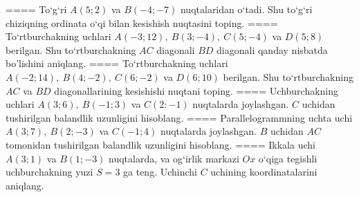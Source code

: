 ====
To‘g‘ri \(A (5;2) \) va \(B (-4; -7) \) nuqtalaridan o‘tadi.
Shu to‘g‘ri chiziqning ordinata o‘qi bilan kesishish nuqtasini toping.
====
To‘rtburchakning uchlari
\(A (-3;12),\ B (3;-4),\ C (5;-4) \) va \(D (5;8) \) berilgan. Shu
to‘rtburchakning $AC$ diagonali $BD$ diagonali qanday
nisbatda bo'lishini aniqlang.
====
To‘rtburchakning uchlari
\(A (-2;14),\ B (4;-2),\ C (6;-2) \) va \(D (6;10) \) berilgan. Shu
to‘rtburchakning $AC$ va $BD$ diagonallarining kesishishi
nuqtani toping.
====
Uchburchakning uchlari \(A (3;6),\ B (-1;3) \) va
\(C (2:-1) \) nuqtalarda joylashgan. $C$ uchidan tushirilgan balandlik uzunligini hisoblang.
====
Parallelogrammning uchta uchi \(A (3;7),\ B (2;-3) \) va
\(C (-1;4) \) nuqtalarda joylashgan. $B$ uchidan $AC$
tomonidan tushirilgan balandlik uzunligini hisoblang.
====
Ikkala uchi \(A (3;1) \) va \(B (1;-3) \) nuqtalarda, va
og‘irlik markazi $Ox$ o‘qiga tegishli uchburchakning yuzi
\(S=3\) ga teng. Uchinchi $C$ uchining koordinatalarini aniqlang.